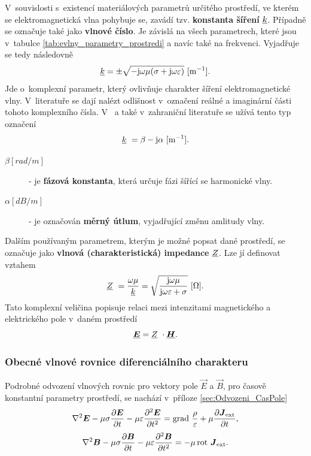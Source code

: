 V~souvislosti s~existencí materiálových parametrů určitého prostředí, ve kterém se elektromagnetická vlna pohybuje se, zavádí tzv. {\bf konstanta šíření} ${\underline{k}}$. Případně se označuje také jako {\bf vlnové číslo}. Je závislá na všech parametrech, které jsou v~tabulce \ref{tab:evlny_parametry_prostredi} a navíc také na frekvenci. Vyjadřuje se tedy následovně
\begin{displaymath}
	{\underline{k}}=\pm\sqrt{-\mathrm{j}\omega\mu(\sigma+\mathrm{j}\omega\varepsilon)}\mathrm{\ [m^{-1}]}.
\end{displaymath}
Jde o~komplexní parametr, který ovlivňuje charakter šíření elektromagnetické vlny. V~literatuře se dají nalézt odlišnost v~označení reálné a imaginární  části tohoto komplexního čísla. V~\cite{emp} a také v~zahraniční literatuře se užívá tento typ označení 
\begin{equation}
	{\underline{k}}~= \beta - \mathrm{j}\alpha\mathrm{\ [m^{-1}]}.
	\label{rce:evlny_alphabeta}
\end{equation}
\begin{description}
\item[$\beta\unit{[rad/m]}$] - je {\bf fázová konstanta}, která určuje fázi šířící se harmonické vlny.
\item[$\alpha\unit{[dB/m]}$] - je označován {\bf měrný útlum}, vyjadřující změnu amlitudy vlny.
\end{description}

Dalším používaným parametrem, kterým je možné popsat dané prostředí, se označuje jako {\bf vlnová (charakteristická) impedance}  ${\underline{Z}}$. Lze jí definovat vztahem
\begin{displaymath}
	{\underline{Z}}~= \frac{\omega\mu}{{\underline{k}}} = \sqrt{\frac{\mathrm{j}\omega\mu}{\mathrm{j}\omega\varepsilon + \sigma}}\mathrm{\ [\Omega]}.
\end{displaymath}
Tato komplexní veličina popisuje relaci mezi intenzitami magnetického a elektrického pole v~daném prostředí
\begin{displaymath}
	\mbox{\underline{\boldmath$E$}} = {\underline{Z}}~\cdot \mbox{\underline{\boldmath$H$}}.
\end{displaymath}

\subsubsection*{Obecné vlnové rovnice diferenciálního charakteru}
 Podrobné odvození vlnových rovnic pro vektory pole $\vec E$ a $\vec B$, pro časově konstantní parametry prostředí, se nachází v~příloze \ref{sec:Odvozeni_CasPole}
\begin{equation}
	\nabla^{2}\mbox{\boldmath$E$} -\mu\sigma\frac{\partial\mbox{\boldmath$E$}}{\partial t}-\mu\varepsilon\frac{\partial^{2}\mbox{\boldmath$E$}}{\partial t^{2}} = \mathrm{grad}\ \frac{\rho}{\varepsilon}+\mu\frac{\partial\mbox{\boldmath$J$}_{\mathrm{ext}}}{\partial t},
	\label{rce:evlny_VlnR_ElPole}
\end{equation}
\begin{equation}
	\nabla^{2}\mbox{\boldmath$B$} -\mu\sigma\frac{\partial\mbox{\boldmath$B$}}{\partial t}-\mu\varepsilon\frac{\partial^{2}\mbox{\boldmath$B$}}{\partial t^{2}}= -\mu\,\mathrm{rot}\ \mbox{\boldmath$J$}_{\mathrm{ext}}.
	\label{rce:evlny_VlnR_MagPole}
\end{equation}

